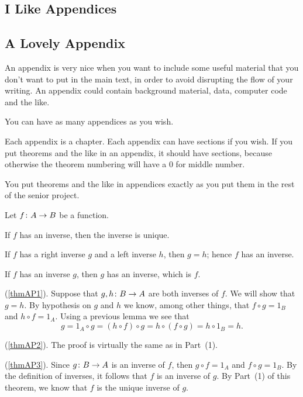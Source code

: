\documentclass[11pt, twoside, reqno]{book}
\begin{document}
\begin{appendices}
\chapter{I Like Appendices}

\section{A Lovely Appendix}

An appendix is very nice when you want to include some useful material that you don't want to put in the main text, in order to avoid disrupting the flow of your writing.  An appendix could contain background material, data, computer code and the like.

You can have as many appendices as you wish.

Each appendix is a chapter.  Each appendix can have sections if you wish.  If you put theorems and the like in an appendix, it should have sections, because otherwise the theorem numbering will have a $0$ for middle number.

You put theorems and the like in appendices exactly as you put them in the rest of the senior project.

\thm\label{thmAP} 
Let ${f} \colon {A} \to {B}$ be a function.
%
\enum 
\item\label{thmAP1}
If $f$ has an inverse, then the inverse is unique.
%
\item\label{thmAP2}
If $f$ has a right inverse $g$ and a left inverse $h$, then $g = h$; hence $f$ has an inverse.
%
\item\label{thmAP3}
If $f$ has an inverse $g$, then $g$ has an inverse, which is $f$.
\eenum
\ethm
 
\demo
(\ref{thmAP1}). Suppose that ${g, h} \colon {B} \to {A}$ are both inverses of $f$.  We will show that $g = h$.  By hypothesis on $g$ and $h$ we know, among other things, that $f \circ g = 1_B$ and $h \circ f = 1_A$.  Using a previous lemma we see that
%
\[
g  =  1_A \circ g  =  (h \circ f) \circ g  =  h \circ (f \circ g)  =  h \circ 1_B  =  h.
\]

\noindent (\ref{thmAP2}). The proof is virtually the same as in Part~(1).  
\smallskip

\noindent (\ref{thmAP3}).  Since ${g} \colon {B} \to {A}$ is an inverse of $f$, then $g \circ f = 1_A$ and $f \circ g = 1_B$.  By the definition of inverses, it follows that $f$ is an inverse of $g$.  By Part~(1) of this theorem, we know that $f$ is the unique inverse of $g$.
\edemo

\end{appendices}
\end{document}
